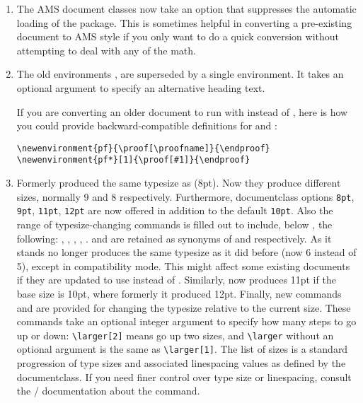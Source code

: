 \documentclass{amsdtx}
\begin{document}
\begin{enumerate}
\item The AMS document classes now take an option  that
suppresses the automatic loading of the  package. This is
sometimes helpful in converting a pre-existing document to AMS style if
you only want to do a quick conversion without attempting to
deal with any of the math.

\item The old environments ,  are superseded by a
single  environment. It takes an optional argument to specify
an alternative heading text.

If you are converting an older document to run with 
instead of , here is how you could provide
backward-compatible definitions for  and :
\begin{verbatim}
\newenvironment{pf}{\proof[\proofname]}{\endproof}
\newenvironment{pf*}[1]{\proof[#1]}{\endproof}
\end{verbatim}

\item Formerly  produced the same typesize as
 (8pt). Now they produce different sizes, normally 9
and 8 respectively. Furthermore, documentclass options \verb'8pt',
\verb'9pt', \verb'11pt', \verb'12pt' are now offered in addition to the
default \verb'10pt'. Also the range of typesize-changing commands is
filled out to include, below , the following: ,
, , , .  and
 are retained as synonyms of  and 
respectively. As it stands  no longer produces the same
typesize as it did before (now 6 instead of 5), except in compatibility
mode. This might affect some existing documents if they are updated to
use  instead of . Similarly,
 now produces 11pt if the base size is 10pt, where formerly it
produced 12pt. Finally, new commands  and  are
provided for changing the typesize relative to the current size. These
commands take an optional integer argument to specify how many steps to
go up or down: \verb'\larger[2]' means go up two sizes, and
\verb'\larger' without an optional argument is the same as
\verb'\larger[1]'. The list of sizes is a standard progression of type
sizes and associated linespacing values as defined by the documentclass.
If you need finer control over type size or linespacing, consult the
\latex/ documentation about the  command.


\end{enumerate}
\end{document}
